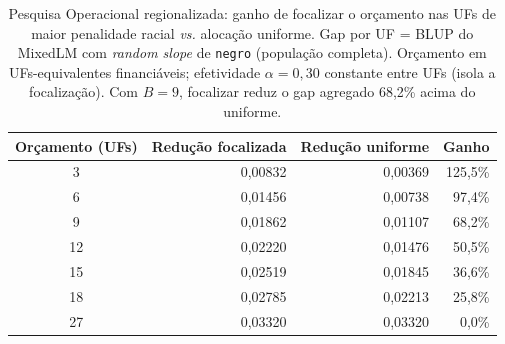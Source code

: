 \begin{table}[H]
  \centering
  \caption{Pesquisa Operacional regionalizada: ganho de focalizar o orçamento
           nas UFs de maior penalidade racial \textit{vs.} alocação uniforme.
           Gap por UF = BLUP do MixedLM com \textit{random slope} de \texttt{negro}
           (população completa). Orçamento em UFs-equivalentes financiáveis;
           efetividade $\alpha=0,30$ constante entre UFs (isola a focalização).
           Com $B=9$, focalizar reduz o gap agregado 68,2\% acima do uniforme.}
  \label{tab:po_regional}
  \small
  \begin{tabular}{crrr}
    \toprule
    \textbf{Orçamento (UFs)} & \textbf{Redução focalizada} & \textbf{Redução uniforme} & \textbf{Ganho} \\
    \midrule
  3 & 0,00832 & 0,00369 & 125,5\% \\
  6 & 0,01456 & 0,00738 & 97,4\% \\
  9 & 0,01862 & 0,01107 & 68,2\% \\
  12 & 0,02220 & 0,01476 & 50,5\% \\
  15 & 0,02519 & 0,01845 & 36,6\% \\
  18 & 0,02785 & 0,02213 & 25,8\% \\
  27 & 0,03320 & 0,03320 & 0,0\% \\
    \bottomrule
  \end{tabular}
\end{table}


